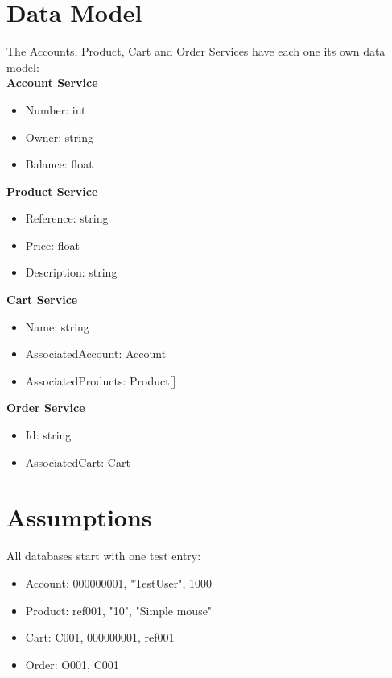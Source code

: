 
\section{Data Model}

The Accounts, Product, Cart and Order Services have each one its own data model:\\


\textbf{Account Service}
\begin{itemize}
\item Number: int
\item Owner: string
\item Balance: float\\
\end{itemize}


\textbf{Product Service}
\begin{itemize}
\item Reference: string
\item Price: float
\item Description: string\\
\end{itemize}


\textbf{Cart Service}
\begin{itemize}
\item Name: string
\item AssociatedAccount: Account
\item AssociatedProducts: Product[]\\
\end{itemize}


\textbf{Order Service}
\begin{itemize}
\item Id: string
\item AssociatedCart: Cart\\
\end{itemize}


\section{Assumptions}

All databases start with one test entry:

\begin{itemize}
\item Account: 000000001, "TestUser", 1000
\item Product: ref001, "10", "Simple mouse"
\item Cart: C001, 000000001, ref001
\item Order: O001, C001
\end{itemize}
